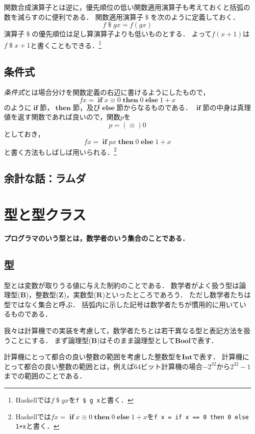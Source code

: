 \documentclass[twocolumn]{jsbook}
\newcommand{\hsklType}[1]{\textbf{#1}}
\newcommand{\hsklBool}{\hsklType{Bool}}
\newcommand{\hsklInt}{\hsklType{Int}}
\newcommand{\mathKeyword}[1]{\mathbf{#1}}
\DeclareMathOperator{\mathApply}{\$}
\DeclareMathOperator{\mathElse}{\mathKeyword{else}}
\DeclareMathOperator{\mathIf}{\mathKeyword{if}}
\DeclareMathOperator{\mathThen}{\mathKeyword{then}}
\newcommand{\mathSet}[1]{\mathbf{#1}}
\newcommand{\keyword}[1]{\emph{#1}}
\newcommand{\code}[1]{\texttt{#1}}
\newenvironment{leader}{\begingroup\bf}{\endgroup}
\newcommand{\binaryeq}{\equiv}
\newcommand{\keywordname}[1]{\mathbf{#1}}
\newcommand{\keywordif}{\mathop{\keywordname{if}}}
\newcommand{\keywordthen}{\mathop{\keywordname{then}}}
\newcommand{\keywordelse}{\mathop{\keywordname{else}}}
\begin{document}
関数合成演算子とは逆に，優先順位の低い関数適用演算子も考えておくと括弧の数を減らすのに便利である．
関数適用演算子$\mathApply$を次のように定義しておく．
$$f\mathApply gx=f(gx)$$
演算子$\mathApply$の優先順位は足し算演算子よりも低いものとする．
よって$f(x+1)$は$f\mathApply x+1$と書くこともできる．\footnote{Haskellでは$f\mathApply gx$を\code{f \$ g x}と書く．}

\section{条件式}

\keyword{条件式}とは場合分けを関数定義の右辺に書けるようにしたもので，
$$fx=\mathIf x\equiv0\mathThen0\mathElse1+x$$
のように$\mathIf$節，$\mathThen$節，及び$\mathElse$節からなるものである．
$\mathIf$節の中身は真理値を返す関数であれば良いので，関数$p$を$$p=(\equiv)0$$としておき，$$fx=\mathIf px\mathThen0\mathElse1+x$$と書く方法もしばしば用いられる．\footnote{Haskellでは$fx=\keywordif x\binaryeq0\keywordthen0\keywordelse1+x$を\code{f x = if x == 0 then 0 else 1+x}と書く．}

\section*{余計な話：ラムダ}


\chapter{型と型クラス}

\begin{leader}
プログラマのいう型とは，数学者のいう集合のことである．
\end{leader}


\section{型}

型とは変数が取りうる値に与えた制約のことである．
数学者がよく扱う型は論理型($\mathSet{B}$)，整数型($\mathSet{Z}$)，実数型($\mathSet{R}$)といったところであろう．
ただし数学者たちは型ではなく集合と呼ぶ．
括弧内に示した記号は数学者たちが慣用的に用いているものである．

我々は計算機での実装を考慮して，数学者たちとは若干異なる型と表記方法を扱うことにする．
まず論理型($\mathSet{B}$)はそのまま論理型として$\hsklBool$で表す．

計算機にとって都合の良い整数の範囲を考慮した整数型を$\hsklInt$で表す．
計算機にとって都合の良い整数の範囲とは，例えば64ビット計算機の場合$-2^{32}$から$2^{32}-1$までの範囲のことである．
\end{document}
